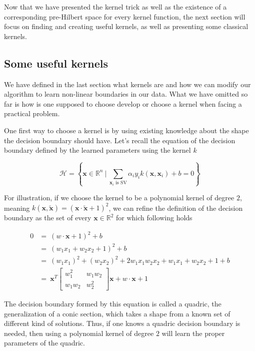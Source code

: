 Now that we have presented the kernel trick as well as the existence of a corresponding pre-Hilbert space for every kernel function, the next section will focus on finding and creating useful kernels, as well as presenting some classical kernels.

\subsection {Some useful kernels}

We have defined in the last section what kernels are and how we can modify our algorithm to learn non-linear boundaries in our data. What we have omitted so far is how is one supposed to choose develop or choose a kernel when facing a practical problem.

One first way to choose a kernel is by using existing knowledge about the shape the decision boundary should have. Let's recall the equation of the decision boundary defined by the learned parameters using the kernel $k$

\begin{equation*}
  \mathscr{H} = \left\{\mathbf{x} \in \mathbb{R}^n\ |\ \sum_{\mathbf{x}_i \text{ is SV}}\alpha_iy_ik\left(\mathbf{x}, \mathbf{x}_i\right) + b = 0\right\}
\end{equation*}

For illustration, if we choose the kernel to be a polynomial kernel of degree $2$, meaning $k\left(\mathbf{x}, \mathbf{\tilde{x}}\right) = \left(\mathbf{x} \cdot \mathbf{\tilde{x}} + 1\right)^2$, we can refine the definition of the decision boundary as the set of every $\mathbf{x} \in \mathbb{R}^2$ for which following holds

\begin{equation*}
  \begin{aligned}
    0 &=\ \left(w \cdot \mathbf{x} + 1\right)^2 + b\\
      &=\ \left(w_1x_1 + w_2x_2 + 1\right)^2 + b\\
      &=\ (w_1x_1)^2 + (w_2x_2)^2 + 2w_1x_1w_2x_2 + w_1x_1 + w_2x_2 + 1 + b\\
      &=\ \mathbf{x}^T\begin{bmatrix}w_1^2 & w_1w_2\\ w_1w_2 & w_2^2\end{bmatrix}\mathbf{x} + w \cdot \mathbf{x} + 1 
  \end{aligned}
\end{equation*}

The decision boundary formed by this equation is called a quadric, the generalization of a conic section, which takes a shape from a known set of different kind of solutions. Thus, if one knows a quadric decision boundary is needed, then using a polynomial kernel of degree $2$ will learn the proper parameters of the quadric.

